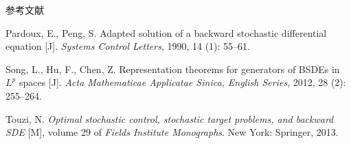 \documentclass[xcolor=svgnames,serif,table,10pt]{beamer}
\begin{document}
\begin{frame}[allowframebreaks]{参考文献}
\begin{thebibliography}{57}
Pardoux, E., Peng, S.
\newblock Adapted solution of a backward stochastic differential equation [J].
\newblock \emph{Systems Control Letters}, 1990, 14 (1):
  55--61.








Song, L., Hu, F., Chen, Z.
\newblock Representation theorems for generators of {BSDE}s in ${L}^p$
  spaces [J].
\newblock \emph{Acta Mathematicae Applicatae Sinica, English Series}, 2012,
  28 (2): 255--264.

Touzi, N.
\newblock \emph{Optimal stochastic control, stochastic target problems, and
  backward {SDE}} [M], volume 29 of \emph{Fields Institute Monographs}.
\newblock New York: Springer, 2013.


\end{thebibliography}
\end{frame}
\end{document}

